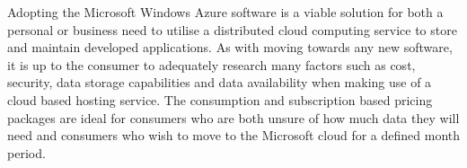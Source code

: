 \begin{itemize}
Adopting the Microsoft Windows Azure software is a viable solution for both a personal or business need to utilise a distributed cloud computing service to store and maintain developed applications. As with moving towards any new software, it is up to the consumer to adequately research many factors such as cost, security, data storage capabilities and data availability when making use of a cloud based hosting service. The consumption and subscription based pricing packages are ideal for consumers who are both unsure of how much data they will need and consumers who wish to move to the Microsoft cloud for a defined month period.

\end{itemize}
